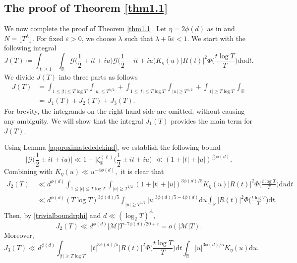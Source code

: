 \documentclass[12pt,reqno]{amsart}
\theoremstyle{definition}
\numberwithin{equation}{section}
\newcommand{\mbk}{\mathbb{K}}
\newcommand{\mbr}{\mathbb{R}}
\newcommand{\mcg}{\mathcal{G}}
\newcommand{\mcm}{\mathcal{M}}
\begin{document}
\subsection{The proof of Theorem \ref{thm1.1}}
\label{proofthm1.1process}
We now complete the proof of Theorem \ref{thm1.1}. Let $\eta = 2\phi(d)$ as in \cite{bondarenko2023dichotomy} and $N = \lfloor T^\lambda \rfloor$. For fixed $\varepsilon >0$, we choose $\lambda$ such that $\lambda +5\varepsilon <1$. We start with the following integral
$$
J(T)\coloneqq\int_{|t|\ge1}\int_\mbr\mcg\Big(\frac{1}{2} + it + iu\Big)\mcg\Big(\frac{1}{2} - it + i u\Big)K_{\eta}(u)|R(t)|^{2}\Phi\Big(\frac{t\log T}{T}\Big)\mathrm{d}u\mathrm{d}t.
$$
We divide $J(T)$ into three parts as follows
\begin{align}
\label{J=J123}
J(T) & = \int_{1\le |t| \le T \log T}\int_{|u| \le T^{1/2}} + \int_{1\le |t| \le T \log T}\int_{|u| \ge T^{1/2}} + \int_{|t| \ge T \log T}\int_{\mbr} \nonumber \\
& \eqqcolon J_1 (T)+ J_2 (T)+ J_3 (T).
\end{align}
For brevity, the integrands on the right-hand side are omitted, without causing any ambiguity. We will show that the integral $J_1(T)$ provides the main term for $J(T)$.
\par
Using Lemma \ref{approximatededekind}, we establish the following bound 
\begin{equation}
        \label{GKellupperbound}
\Big|\mcg\Big(\frac{1}{2}\pm it + iu\Big)\Big|\ll 1 + \Big|\zeta_\mbk^{(\ell)}\Big(\frac{1}{2} \pm it + iu\Big)\Big|\ll (1 + |t| + |u|)^{\frac{3}{10}\phi(d)}.
\end{equation}
Combining with $K_{\eta}(u) \ll u^{-4\phi(d)},$ it is clear that
\begin{align*}
    J_2 (T) &\,\ll d^{\phi(d)} \int_{1\le |t| \le T \log T}\int_{|u| \ge T^{1/2}} (1 + |t| + |u|)^{3\phi(d)/5} K_{\eta}(u)|R(t)|^{2}\Phi\Big(\frac{t\log T}{T}\Big)\mathrm{d}u\mathrm{d}t \\
           &\,\ll d^{\phi(d)} ( T \log T)^{3\phi(d)/5}\int_{|u| \ge T^{1/2}} |u| ^{3\phi(d)/5-4\phi(d)}\mathrm{d}u \int_\mbr|R(t)|^{2}\Phi\Big(\frac{t\log T}{T}\Big)\mathrm{d}t.
\end{align*}
Then, by \eqref{trivialboundrphi} and $d \ll (\log_2 T)^A,$
\begin{equation}
\label{J2upperbound}
    J_2(T)  \ll d^{\phi(d)} |\mcm|T^{-7\phi(d)/20+\varepsilon}=o(|\mcm|T).
\end{equation}
Moreover,
$$
J_3 (T) \ll d^{\phi(d)} \int_{|t| \ge T \log T} |t|^{3\phi(d)/5}|R(t)|^{2}\Phi\Big(\frac{t\log T}{T}\Big)\mathrm{d}t \int_\mbr |u|^{3\phi(d)/5} K_{\eta}(u)\mathrm{d}u.
$$
\end{document}
